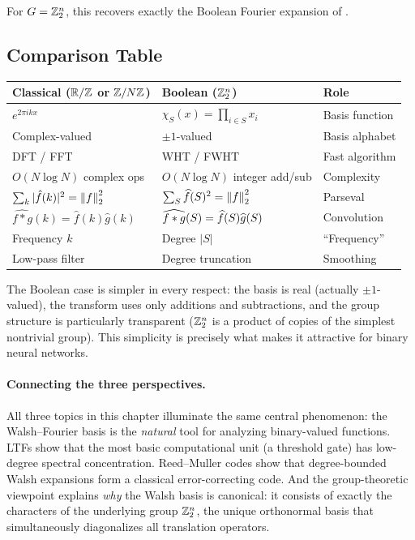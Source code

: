 For $G = \mathbb{Z}_2^n$, this recovers exactly the Boolean Fourier expansion of
.

\subsection{Comparison Table}\label{sec:comparison-table}

\begin{center}
\begin{tabular}{lll}
\toprule
\textbf{Classical ($\mathbb{R}/\mathbb{Z}$ or $\mathbb{Z}/N\mathbb{Z}$)} & \textbf{Boolean ($\mathbb{Z}_2^n$)} & \textbf{Role} \\
\midrule
$e^{2\pi i k x}$ & $\chi_S(x) = \prod_{i \in S} x_i$ & Basis function \\
Complex-valued & $\pm 1$-valued & Basis alphabet \\
DFT / FFT & WHT / FWHT & Fast algorithm \\
$O(N \log N)$ complex ops & $O(N \log N)$ integer add/sub & Complexity \\
$\sum_k |\hat{f}(k)|^2 = \left\| f \right\|_2^2$ & $\sum_S \widehat{f}(S)^2 = \left\| f \right\|_2^2$ & Parseval \\
$\widehat{f \ast g}(k) = \hat{f}(k)\hat{g}(k)$ & $\widehat{f \ast g}(S) = \widehat{f}(S)\widehat{g}(S)$ & Convolution \\
Frequency $k$ & Degree $|S|$ & ``Frequency'' \\
Low-pass filter & Degree truncation & Smoothing \\
\bottomrule
\end{tabular}
\end{center}

The Boolean case is simpler in every respect: the basis is real (actually
$\pm 1$-valued), the transform uses only additions and subtractions, and
the group structure is particularly transparent ($\mathbb{Z}_2^n$ is a product of
copies of the simplest nontrivial group). This simplicity is precisely
what makes it attractive for binary neural networks.

\medskip
\paragraph{Connecting the three perspectives.}
All three topics in this chapter illuminate the same central phenomenon:
the Walsh--Fourier basis is the \emph{natural} tool for analyzing
binary-valued functions. LTFs show that the most basic computational
unit (a threshold gate) has low-degree spectral concentration. Reed--Muller
codes show that degree-bounded Walsh expansions form a classical
error-correcting code. And the group-theoretic viewpoint explains
\emph{why} the Walsh basis is canonical: it consists of exactly the
characters of the underlying group $\mathbb{Z}_2^n$, the unique orthonormal
basis that simultaneously diagonalizes all translation operators.


